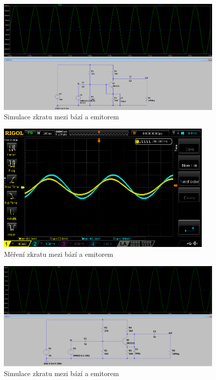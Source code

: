 \documentclass{article}
\begin{document}

\begin{figure}[H]
  \centering
  \includegraphics[width=\textwidth]{sim/ukol1/porucha5.png}
  \caption{Simulace zkratu mezi bází a emitorem}
  \label{fig:sch-se-p5}
\end{figure}

\begin{figure}[H]
  \centering
  \includegraphics[width=0.95\textwidth]{mereni/NewFolder1/NewFile4.png}
  \caption{Měření zkratu mezi bází a emitorem}
  \label{fig:m-sch-se-p1}
\end{figure}


\begin{figure}[H]
  \centering
  \includegraphics[width=\textwidth]{sim/ukol1/porucha6.png}
  \caption{Simulace zkratu mezi bází a emitorem}
  \label{fig:sch-se-p6}
\end{figure}
\end{document}
